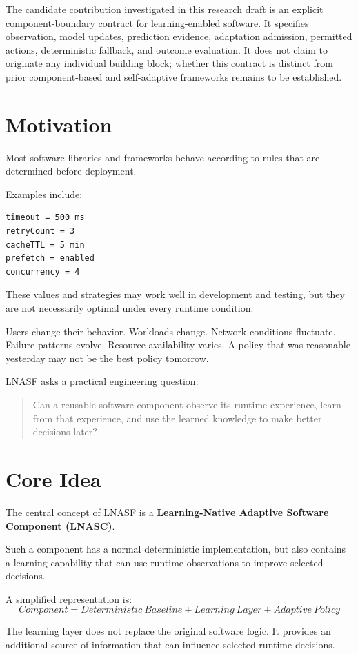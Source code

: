 \documentclass[11pt,a4paper]{article}
\begin{document}
The candidate contribution investigated in this research draft is an explicit component-boundary contract for learning-enabled software. It specifies observation, model updates, prediction evidence, adaptation admission, permitted actions, deterministic fallback, and outcome evaluation. It does not claim to originate any individual building block; whether this contract is distinct from prior component-based and self-adaptive frameworks remains to be established.

\section{Motivation}
Most software libraries and frameworks behave according to rules that are determined before deployment.

Examples include:
\begin{lstlisting}
timeout = 500 ms
retryCount = 3
cacheTTL = 5 min
prefetch = enabled
concurrency = 4
\end{lstlisting}

These values and strategies may work well in development and testing, but they are not necessarily optimal under every runtime condition.

Users change their behavior. Workloads change. Network conditions fluctuate. Failure patterns evolve. Resource availability varies. A policy that was reasonable yesterday may not be the best policy tomorrow.

LNASF asks a practical engineering question:
\begin{quote}
Can a reusable software component observe its runtime experience, learn from that experience, and use the learned knowledge to make better decisions later?
\end{quote}

\section{Core Idea}
The central concept of LNASF is a \textbf{Learning-Native Adaptive Software Component (LNASC)}.

Such a component has a normal deterministic implementation, but also contains a learning capability that can use runtime observations to improve selected decisions.

A simplified representation is:
\[
Component = Deterministic\ Baseline + Learning\ Layer + Adaptive\ Policy
\]

The learning layer does not replace the original software logic. It provides an additional source of information that can influence selected runtime decisions.
\end{document}
